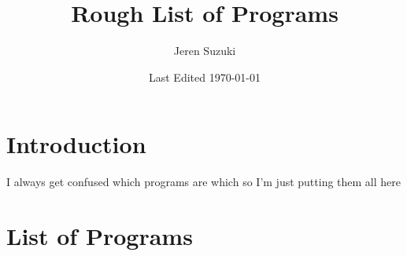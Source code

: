 \documentclass[10pt]{scrartcl}
\title{Rough List of Programs}
\author{Jeren Suzuki}
\date{Last Edited \today}
\begin{document}
\maketitle
{}
\tableofcontents
{}
\clearpage
{}

\section*{Introduction} %
\label{sec:introduction}
I always get confused which programs are which so I'm just putting them all here

\section{List of Programs} %
\label{sec:list_of_programs}
\end{document}

